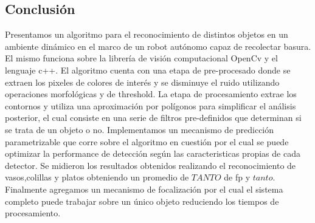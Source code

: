 	
\subsection{Conclusi\'on}
Presentamos un algoritmo para el reconocimiento de distintos objetos en 
un ambiente dinámico en el marco de un robot autónomo capaz de 
recolectar basura. El mismo funciona sobre la librería de visión 
computacional OpenCv y el lenguaje c++.  El algoritmo cuenta
con una etapa de pre-procesado donde se extraen los pixeles de colores de interés y se disminuye el ruido utilizando 
operaciones morfológicas y de threshold. La etapa de procesamiento extrae los contornos y utiliza una aproximación por polígonos
para simplificar el análisis posterior, el cual consiste en una serie de filtros pre-definidos que determinan si se trata de un objeto o no. 
Implementamos un mecanismo de predicción parametrizable que corre sobre el algoritmo 
en cuestión por el cual se puede optimizar la performance de 
detección según las caracteristicas propias de cada detector. Se 
midieron los resultados obtenidos realizando el reconocimiento de 
vasos,colillas y platos obteniendo un promedio de $TANTO$ de fp y 
$tanto$. Finalmente agregamos un mecanismo de focalización por el cual 
el sistema completo puede trabajar sobre un único objeto reduciendo 
los tiempos de procesamiento. 


